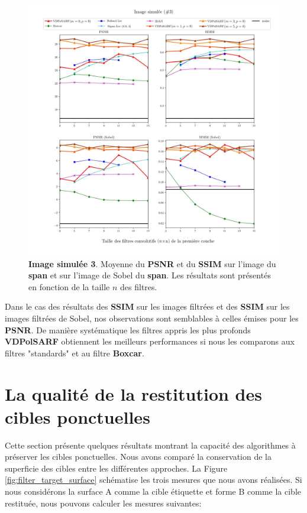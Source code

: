 \begin{figure}[!htbp] 
\includegraphics[width=1.0\textwidth]{figures/Chap4/results/analyse_multi_sigs/psnr/img_multipolsar_003_noised.jpg}
 \centering
  \caption{
  \footnotesize{  \textbf{Image simulée 3}. Moyenne du \textbf{PSNR} et du \textbf{SSIM} sur l'image du \textbf{span} et sur l'image de Sobel du \textbf{span}.  Les résultats sont présentés en fonction de la taille $n$ des filtres.
  }}
  \label{fig:filter_psnr_3}
\end{figure}

Dans le cas des résultats des \textbf{SSIM} sur les images filtrées et des \textbf{SSIM} sur les images filtrées de Sobel, nos observations sont semblables à celles émises pour les \textbf{PSNR}. De manière systématique les filtres appris les plus profonds \textbf{VDPolSARF} obtiennent les meilleurs performances si nous les comparons aux filtres "standards" et au filtre \textbf{Boxcar}.


\section{La qualité de la restitution des cibles ponctuelles}

Cette section présente quelques résultats montrant la capacité des algorithmes à préserver les cibles ponctuelles. Nous avons comparé la conservation de la superficie des cibles entre les différentes approches.  La Figure \ref{fig:filter_target_surface} schématise les trois mesures que nous avons réalisées. Si nous considérons la surface A comme la cible étiquette et forme B comme la cible restituée, nous pouvons calculer les mesures suivantes:

